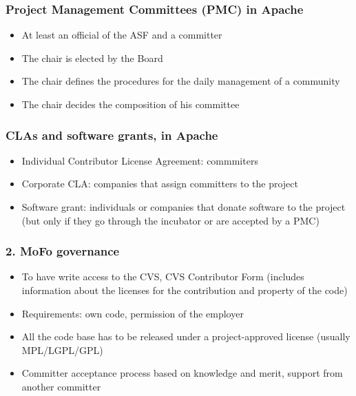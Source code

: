 \documentclass{beamer}
\begin{document}

\begin{frame}
\frametitle{Project Management Committees (PMC) in Apache}

\begin{itemize}
\item At least an official of the ASF and a committer
\item The chair is elected by the Board
\item The chair defines the procedures for the daily management of a community
\item The chair decides the composition of his committee
\end{itemize}

\end{frame}


\begin{frame}
\frametitle{CLAs and software grants, in Apache}

\begin{itemize}
\item Individual Contributor License Agreement: commmiters
\item Corporate CLA: companies that assign committers to the project
\item Software grant: individuals or companies that donate software to the
project (but only if they go through the incubator or are accepted by a PMC)
\end{itemize}

\end{frame}


\begin{frame}
 \frametitle{2. MoFo governance}
 \begin{itemize}
  \item To have write access to the CVS, CVS Contributor Form 
(includes information about the licenses for the contribution and property of the code)
  \item Requirements: own code, permission of the employer
  \item All the code base has to be released under a project-approved license (usually MPL/LGPL/GPL)
  \item Committer acceptance process based on knowledge and merit, support from another committer
 \end{itemize}

\end{frame}
\end{document}
